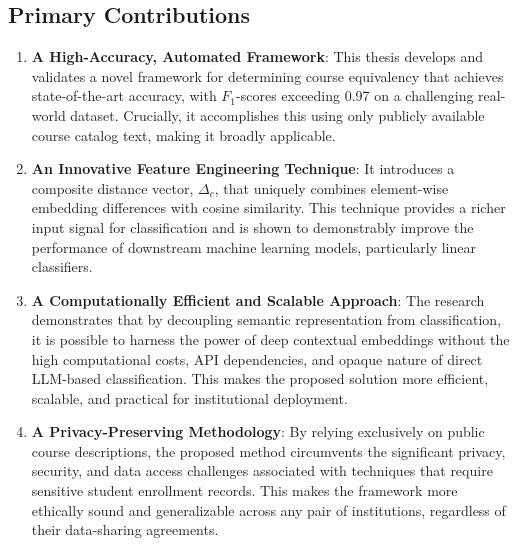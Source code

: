 \begin{introduction}
\subsection{Primary Contributions}
\begin{enumerate}
\item \textbf{A High-Accuracy, Automated Framework}: This thesis develops and validates a novel framework for determining course equivalency that achieves state-of-the-art accuracy, with \(F_1\)-scores exceeding 0.97 on a challenging real-world dataset. Crucially, it accomplishes this using only publicly available course catalog text, making it broadly applicable.
\item \textbf{An Innovative Feature Engineering Technique}: It introduces a composite distance vector, \(\Delta_c\), that uniquely combines element-wise embedding differences with cosine similarity. This technique provides a richer input signal for classification and is shown to demonstrably improve the performance of downstream machine learning models, particularly linear classifiers.
\item \textbf{A Computationally Efficient and Scalable Approach}: The research demonstrates that by decoupling semantic representation from classification, it is possible to harness the power of deep contextual embeddings without the high computational costs, API dependencies, and opaque nature of direct LLM-based classification. This makes the proposed solution more efficient, scalable, and practical for institutional deployment.
\item \textbf{A Privacy-Preserving Methodology}: By relying exclusively on public course descriptions, the proposed method circumvents the significant privacy, security, and data access challenges associated with techniques that require sensitive student enrollment records. This makes the framework more ethically sound and generalizable across any pair of institutions, regardless of their data-sharing agreements.
\end{enumerate}


\end{introduction}
